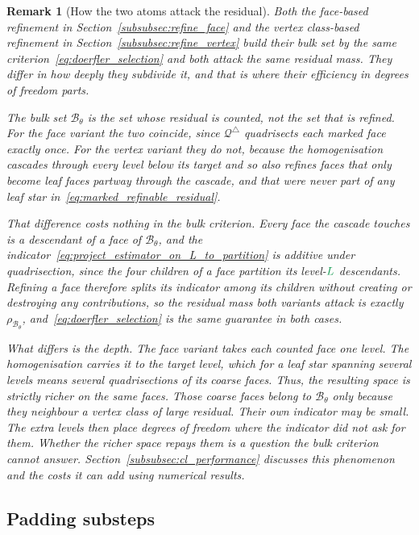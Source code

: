 \documentclass[a4paper, 12pt]{article}
\newcommand{\quadriF}{\mathcal{Q}^{\triangle}}                   %
\newcommand{\green}{\color{ForestGreen}}
\renewcommand{\L}{{\green L}}
\newcommand{\B}{\mathcal{B}}
\newtheorem{remark}[theorem]{Remark}
\theoremstyle{definition}
\theoremstyle{plain}
\numberwithin{equation}{section}
\begin{document}
\begin{remark}[How the two atoms attack the residual]
\label{rem:refinement_atoms}
    Both the face-based refinement in Section~\ref{subsubsec:refine_face} and the vertex class-based refinement in Section~\ref{subsubsec:refine_vertex} build their bulk set by the same criterion~\eqref{eq:doerfler_selection} and both attack the same residual mass. They differ in how deeply they subdivide it, and that is where their efficiency in degrees of freedom parts.

    The bulk set $\B_\theta$ is the set whose residual is counted, not the set that is refined. For the face variant the two coincide, since $\quadriF$ quadrisects each marked face exactly once. For the vertex variant they do not, because the homogenisation cascades through every level below its target and so also refines faces that only become leaf faces partway through the cascade, and that were never part of any leaf star in~\eqref{eq:marked_refinable_residual}.

    That difference costs nothing in the bulk criterion. Every face the cascade touches is a descendant of a face of $\B_\theta$, and the indicator~\eqref{eq:project_estimator_on_L_to_partition} is additive under quadrisection, since the four children of a face partition its level-$\L$ descendants. Refining a face therefore splits its indicator among its children without creating or destroying any contributions, so the residual mass both variants attack is exactly $\rho_{\B_\theta}$, and~\eqref{eq:doerfler_selection} is the same guarantee in both cases.

    What differs is the depth. The face variant takes each counted face one level. The homogenisation carries it to the target level, which for a leaf star spanning several levels means several quadrisections of its coarse faces. Thus, the resulting space is strictly richer on the same faces. Those coarse faces belong to $\B_\theta$ only because they neighbour a vertex class of large residual. Their own indicator may be small. The extra levels then place degrees of freedom where the indicator did not ask for them. Whether the richer space repays them is a question the bulk criterion cannot answer. Section~\ref{subsubsec:cl_performance} discusses this phenomenon and the costs it can add using numerical results.
\end{remark}
\FloatBarrier

\subsection{Padding substeps}
\label{subsec:padding}
\end{document}
